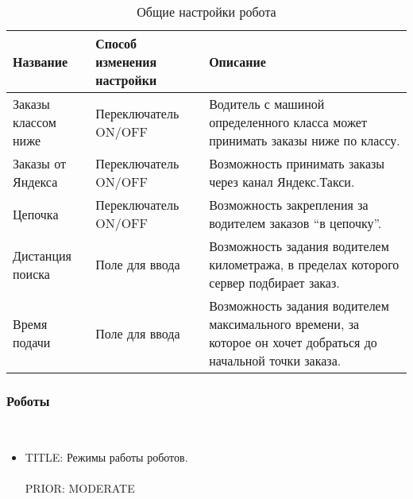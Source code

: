       \begin{table}[h] 
        \begin{center}
        \caption {Общие настройки робота}
        \label{driver_app_robot_tab_table_general_settings}
        \setlength{\extrarowheight}{2mm}
        \begin{tabular}{|p{4cm}|p{3cm}|p{8cm}|}

          \hline     \textbf{Название}&\textbf{Способ изменения настройки}&\textbf{Описание} \\ [2mm]

          \hline   Заказы классом ниже & Переключатель ON/OFF & Водитель с машиной определенного класса может принимать заказы ниже по классу.\\ [2mm]

          \hline   Заказы от Яндекса & Переключатель ON/OFF & Возможность принимать заказы через канал Яндекс.Такси. \\ [2mm]
            
          \hline   Цепочка & Переключатель ON/OFF & Возможность закрепления за водителем заказов “в цепочку”. \\ [2mm]

          \hline   Дистанция поиска & Поле для ввода & Возможность задания водителем километража, в пределах которого сервер подбирает заказ. \\ [2mm]

          \hline   Время подачи & Поле для ввода & Возможность задания водителем максимального времени, за которое он хочет добраться до начальной точки заказа. \\ [2mm]

          \hline
        \end{tabular}
        \end{center}
      \end{table}

    \subsubsection{Роботы} \label{driver_app_robot_tab_robot_settings} \mbox{}\\

      \begin{itemize}

        \item{
          TITLE: Режимы работы роботов. \\
          \\
          PRIOR: MODERATE\\}
      \end{itemize}

